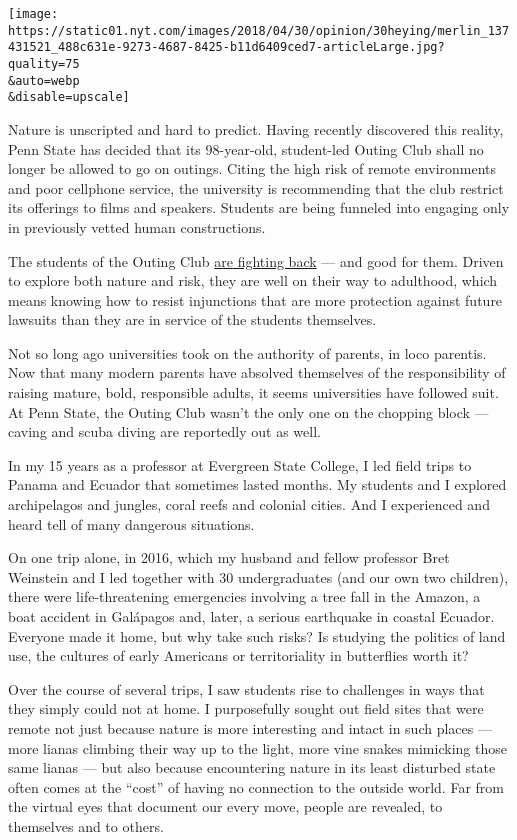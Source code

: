 \texttt{[image: https://static01.nyt.com/images/2018/04/30/opinion/30heying/merlin\_137431521\_488c631e-9273-4687-8425-b11d6409ced7-articleLarge.jpg?quality=75\\\&auto=webp\\\&disable=upscale]}

Nature is unscripted and hard to predict. Having recently discovered
this reality, Penn State has decided that its 98-year-old, student-led
Outing Club shall no longer be allowed to go on outings. Citing the high
risk of remote environments and poor cellphone service, the university
is recommending that the club restrict its offerings to films and
speakers. Students are being funneled into engaging only in previously
vetted human constructions.

The students of the Outing Club
\href{http://sites.psu.edu/outingclub/}{are fighting back} --- and good
for them. Driven to explore both nature and risk, they are well on their
way to adulthood, which means knowing how to resist injunctions that are
more protection against future lawsuits than they are in service of the
students themselves.

Not so long ago universities took on the authority of parents, in loco
parentis. Now that many modern parents have absolved themselves of the
responsibility of raising mature, bold, responsible adults, it seems
universities have followed suit. At Penn State, the Outing Club wasn't
the only one on the chopping block --- caving and scuba diving are
reportedly out as well.

\begin{quote}
\end{quote}

In my 15 years as a professor at Evergreen State College, I led field
trips to Panama and Ecuador that sometimes lasted months. My students
and I explored archipelagos and jungles, coral reefs and colonial
cities. And I experienced and heard tell of many dangerous situations.

On one trip alone, in 2016, which my husband and fellow professor Bret
Weinstein and I led together with 30 undergraduates (and our own two
children), there were life-threatening emergencies involving a tree fall
in the Amazon, a boat accident in Galápagos and, later, a serious
earthquake in coastal Ecuador. Everyone made it home, but why take such
risks? Is studying the politics of land use, the cultures of early
Americans or territoriality in butterflies worth it?

Over the course of several trips, I saw students rise to challenges in
ways that they simply could not at home. I purposefully sought out field
sites that were remote not just because nature is more interesting and
intact in such places --- more lianas climbing their way up to the
light, more vine snakes mimicking those same lianas --- but also because
encountering nature in its least disturbed state often comes at the
``cost'' of having no connection to the outside world. Far from the
virtual eyes that document our every move, people are revealed, to
themselves and to others.

